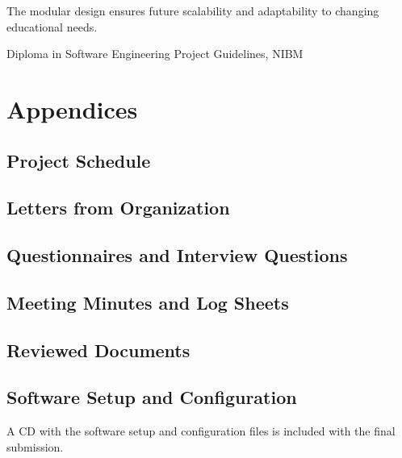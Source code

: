 \documentclass[12pt,a4paper]{report}
\begin{document}
The modular design ensures future scalability and adaptability to changing educational needs.

\newpage
\begin{thebibliography}{9}
     Diploma in Software Engineering Project Guidelines, NIBM
\end{thebibliography}

\appendix
\chapter{Appendices}
\section{Project Schedule}

\section{Letters from Organization}

\section{Questionnaires and Interview Questions}

\section{Meeting Minutes and Log Sheets}

\section{Reviewed Documents}

\section{Software Setup and Configuration}
A CD with the software setup and configuration files is included with the final submission.

\end{document}

